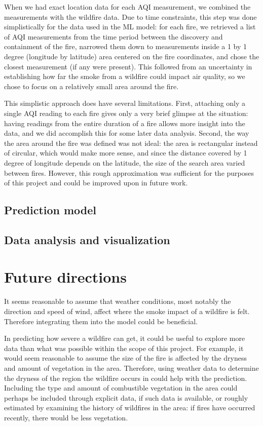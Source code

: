 \documentclass[a4paper,12pt]{article}
\begin{document}
When we had exact location data for each AQI measurement, we combined the measurements with the wildfire data. Due to time constraints, this step was done simplistically for the data used in the ML model: for each fire, we retrieved a list of AQI measurements from the time period between the discovery and containment of the fire, narrowed them down to measurements inside a 1 by 1 degree (longitude by latitude) area centered on the fire coordinates, and chose the closest measurement (if any were present). This followed from an uncertainty in establishing how far the smoke from a wildfire could impact air quality, so we chose to focus on a relatively small area around the fire.

This simplistic approach does have several limitations. First, attaching only a single AQI reading to each fire gives only a very brief glimpse at the situation: having readings from the entire duration of a fire allows more insight into the data, and we did accomplish this for some later data analysis. Second, the way the area around the fire was defined was not ideal: the area is rectangular instead of circular, which would make more sense, and since the distance covered by 1 degree of longitude depends on the latitude, the size of the search area varied between fires. However, this rough approximation was sufficient for the purposes of this project and could be improved upon in future work.

\subsection{Prediction model}

\subsection{Data analysis and visualization}

\section{Future directions}

It seems reasonable to assume that weather conditions, most notably the direction and speed of wind, affect where the smoke impact of a wildfire is felt. Therefore integrating them into the model could be beneficial.

In predicting how severe a wildfire can get, it could be useful to explore more data than what was possible within the scope of this project. For example, it would seem reasonable to assume the size of the fire is affected by the dryness and amount of vegetation in the area. Therefore, using weather data to determine the dryness of the region the wildfire occurs in could help with the prediction. Including the type and amount of combustible vegetation in the area could perhaps be included through explicit data, if such data is available, or roughly estimated by examining the history of wildfires in the area: if fires have occurred recently, there would be less vegetation.
\end{document}

